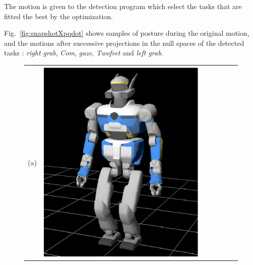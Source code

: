 \documentclass[letterpaper, 10pt, conference]{ieeeconf}      %
\begin{document}
The motion is given to the detection program
which select the tasks that are fitted the best by the optimization.

Fig.~\ref{fig:snapshotXpqdot} shows samples of posture during the original motion,
and the motions after successive projections
in the null spaces of the detected
tasks : \emph{right grab}, \emph{Com}, \emph{gaze}, \emph{Twofeet} and \emph{left grab}.
\begin{figure}[t]
\centering
\begin{tabular}{c@{}c@{}c@{}c@{}c@{}c@{}c}
(a)&
\parbox[c]{2.4cm}{\includegraphics[width=\linewidth]{img/Pqdot0_0.png.ps}} &

\end{tabular}
\end{figure}
\end{document}

